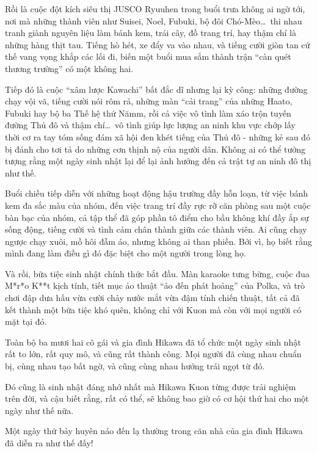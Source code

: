 \documentclass[../main.tex]{subfiles}
\begin{document}
Rồi là cuộc đột kích siêu thị JUSCO Ryuuhen trong buổi trưa không ai ngờ tới, nơi mà những thành viên như Suisei, Noel, Fubuki, bộ đôi Chó-Mèo\dots\ thi nhau tranh giành nguyên liệu làm bánh kem, trái cây, đồ trang trí, hay thậm chí là những hàng thịt tau. Tiếng hò hét, xe đẩy va vào nhau, và tiếng cười giòn tan cứ thế vang vọng khắp các lối đi, biến một buổi mua sắm thành trận ``càn quét thương trường'' có một không hai.

Tiếp đó là cuộc ``xâm lược Kawachi'' bất đắc dĩ nhưng lại kỳ công: những đường chạy vội vã, tiếng cười nói rôm rả, những màn ``cải trang'' của những Haato, Fubuki hay bộ ba Thế hệ thứ Nămm, rồi cả việc vô tình làm xáo trộn tuyến đường Thủ đô và thậm chí\dots\ vô tình giúp lực lượng an ninh khu vực chớp lấy thời cơ ra tay tóm sống đám xã hội đen khét tiếng của Thủ đô - những kẻ sau đó bị đánh cho tơi tả do những cơn thịnh nộ của người dân. Không ai có thể tưởng tượng rằng một ngày sinh nhật lại để lại ảnh hưởng đến cả trật tự an ninh đô thị như thế.

Buổi chiều tiếp diễn với những hoạt động hậu trường đầy hỗn loạn, từ việc bánh kem đa sắc màu của nhóm, đến việc trang trí đầy rực rỡ căn phòng sau một cuộc bàn bạc của nhóm, cả tập thể đã góp phần tô điểm cho bầu không khí đầy ắp sự sống động, tiếng cười và tình cảm chân thành giữa các thành viên. Ai cũng chạy ngược chạy xuôi, mồ hôi đẫm áo, nhưng không ai than phiền. Bởi vì, họ biết rằng mình đang làm điều gì đó đặc biệt cho một người trong lòng họ.

Và rồi, bữa tiệc sinh nhật chính thức bắt đầu. Màn karaoke tưng bừng, cuộc đua M*r*o K**t kịch tính, tiết mục ảo thuật ``ảo đến phát hoảng'' của Polka, và trò chơi đập dưa hấu vừa cười chảy nước mắt vừa đậm tính chiến thuật, tất cả đã kết thành một bữa tiệc khó quên, không chỉ với Kuon mà còn với mọi người có mặt tại đó.

Toàn bộ ba mươi hai cô gái và gia đình Hikawa đã tổ chức một ngày sinh nhật rất to lớn, rất quy mô, và cũng rất thành công. Mọi người đã cùng nhau chuẩn bị, cùng nhau tạo bất ngờ, và cũng cùng nhau hưởng trái ngọt từ đó.

Đó cũng là sinh nhật đáng nhớ nhất mà Hikawa Kuon từng được trải nghiệm trên đời, và cậu biết rằng, rất có thể, sẽ không bao giờ có cơ hội thứ hai cho một ngày như thế nữa.

Một ngày thứ bảy huyên náo đến lạ thường trong căn nhà của gia đình Hikawa đã diễn ra như thế đấy!
\end{document}
